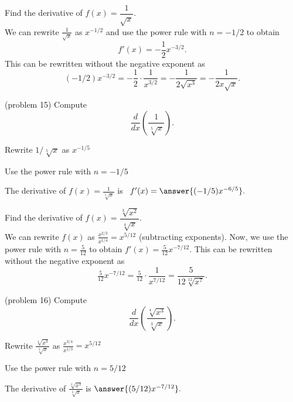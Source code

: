 \documentclass{ximera}
\begin{document}
\begin{example}[example 15]
Find the derivative of $f(x) = \dfrac{1}{\sqrt x}$.\\
We can rewrite $\frac{1}{\sqrt x}$ as $x^{-1/2}$ and use the power rule with $n = -1/2$ to obtain
\[
f'(x) = -\frac12 x^{-3/2}.
\]
This can be rewritten without the negative exponent as
\[
(-1/2)x^{-3/2}= -\frac{1}{2} \cdot \frac{1}{x^{3/2}} = -\frac{1}{2\sqrt{x^3}} = -\frac{1}{2x\sqrt x}.
\]
\end{example}




\begin{problem}(problem 15)
Compute
\[
\frac{d}{dx} \left(\frac{1}{\sqrt[5] x}\right).
\]
\begin{hint}
Rewrite $1/\sqrt[5] x$ as $x^{-1/5}$
\end{hint}
\begin{hint}
Use the power rule with $n = -1/5$
\end{hint}
The derivative of $f(x) = \frac{1}{\sqrt[5] x}$ is \ $f'(x) = \answer{(-1/5) x^{-6/5}}.$
\end{problem}




\begin{example}[example 16]
Find the derivative of $f(x) = \dfrac{\sqrt[3] {x^2}}{\sqrt[4] x}.$\\
We can rewrite $f(x)$ as $\frac{x^{2/3}}{x^{1/4}} = x^{5/12}$ 
(subtracting exponents). Now, we use the power rule with $n = \frac{5}{12}$ to obtain $f'(x) = \tfrac{5}{12}x^{-7/12}.$
This can be rewritten without the negative exponent as
\[
\tfrac{5}{12}x^{-7/12} = \tfrac{5}{12} \cdot \frac{1}{x^{7/12}} = \frac{5}{12\sqrt[12]{x^7}}.
\]
\end{example}




\begin{problem}(problem 16)
Compute
\[
\frac{d}{dx} \left(\frac{\sqrt[4] {x^3}}{\sqrt[3] x}\right).
\]
\begin{hint}
Rewrite $\frac{\sqrt[4] {x^3}}{\sqrt[3] x}$ as $\frac{x^{3/4}}{x^{1/3}} = x^{5/12}$
\end{hint}
\begin{hint}
Use the power rule with $n = 5/12$
\end{hint}
The derivative of $\frac{\sqrt[4] {x^3}}{\sqrt[3] x}$ is $\answer{(5/12) x^{-7/12}}.$
\end{problem}




\begin{center}
\begin{foldable}
\end{foldable}
\end{center}
\end{document}
